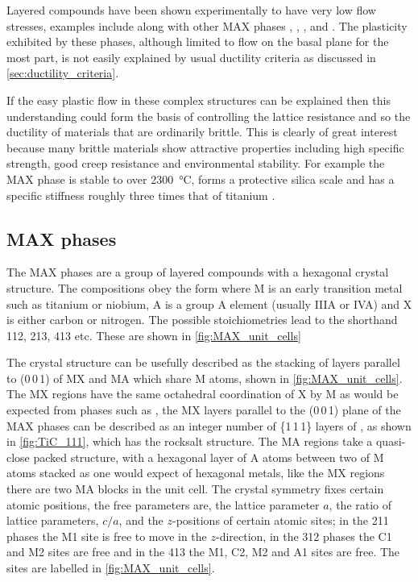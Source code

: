 
Layered compounds have been shown experimentally to have very low flow stresses, examples include  along with other MAX phases \cite{Barsoum2011},  \cite{Korte2012NbCo},  \cite{Telle2006},  and  \cite{Sygnatowicz2015}. The plasticity exhibited by these phases, although limited to flow on the basal plane for the most part, is not easily explained by usual ductility criteria as discussed in \autoref{sec:ductility_criteria}. 

If the easy plastic flow in these complex structures can be explained then this understanding could form the basis of controlling the lattice resistance and so the ductility of materials that are ordinarily brittle. This is clearly of great interest because many brittle materials show attractive properties including high specific strength, good creep resistance and environmental stability. For example the MAX phase  is stable to over \SI{2300}{\celsius}, forms a protective silica scale and has a specific stiffness roughly three times that of titanium \cite{Radovic2013}.

\subsection{MAX phases}

The MAX phases are a group of layered compounds with a hexagonal crystal structure. The compositions obey the form  where M is an early transition metal such as titanium or niobium, A is a group A element (usually IIIA or IVA) and X is either carbon or nitrogen. The possible stoichiometries lead to the shorthand 112, 213, 413 etc. These are shown in \autoref{fig:MAX_unit_cells}

The crystal structure can be usefully described as the stacking of layers parallel to (0\,0\,1) of MX and MA which share M atoms,  shown in \autoref{fig:MAX_unit_cells}. The MX regions have the same octahedral coordination of X by M as would be expected from phases such as , the MX layers parallel to the (0\,0\,1) plane of the MAX phases can be described as an integer number of \{1\,1\,1\} layers of , as shown in \autoref{fig:TiC_111}, which has the rocksalt structure. The MA regions take a quasi-close packed structure, with a hexagonal layer of A atoms between two of M atoms stacked as one would expect of hexagonal metals, like the MX regions there are two MA blocks in the unit cell. The crystal symmetry fixes certain atomic positions, the free parameters are, the lattice parameter $a$, the ratio of lattice parameters, $c/a$, and the $z$-positions of certain atomic sites; in the 211 phases the M1 site is free to move in the $z$-direction, in the 312 phases the C1 and M2 sites are free and in the 413 the M1, C2, M2 and A1 sites are free. The sites are labelled in \autoref{fig:MAX_unit_cells}.


